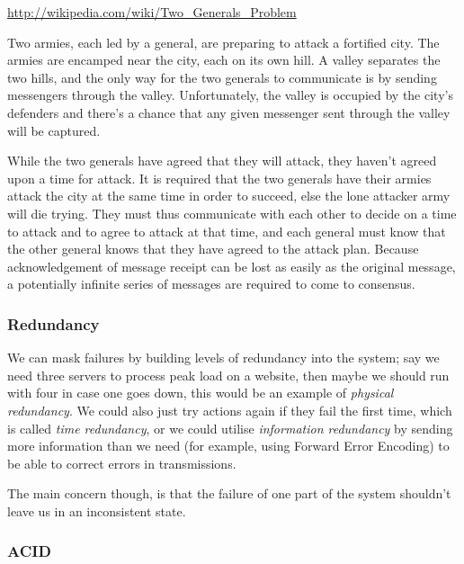 \begin{aquote}{\url{http://wikipedia.com/wiki/Two_Generals_Problem}}

  Two armies, each led by a general, are preparing to attack a fortified city.
  The armies are encamped near the city, each on its own hill. A valley
  separates the two hills, and the only way for the two generals to communicate
  is by sending messengers through the valley. Unfortunately, the valley is
  occupied by the city's defenders and there's a chance that any given messenger
  sent through the valley will be captured.

  While the two generals have agreed that they will attack, they haven't agreed
  upon a time for attack. It is required that the two generals have their armies
  attack the city at the same time in order to succeed, else the lone attacker
  army will die trying. They must thus communicate with each other to decide on
  a time to attack and to agree to attack at that time, and each general must
  know that the other general knows that they have agreed to the attack plan.
  Because acknowledgement of message receipt can be lost as easily as the
  original message, a potentially infinite series of messages are required to
  come to consensus.

\end{aquote}

\subsubsection{Redundancy}


We can mask failures by building levels of redundancy into the system; say we
need three servers to process peak load on a website, then maybe we should run
with four in case one goes down, this would be an example of \textit{physical
redundancy}. We could also just try actions again if they fail the first time,
which is called \textit{time redundancy}, or we could utilise
\textit{information redundancy} by sending more information than we need (for
example, using Forward Error Encoding) to be able to correct errors in
transmissions.

The main concern though, is that the failure of one part of the system shouldn't
leave us in an inconsistent state.

\subsubsection{ACID}

